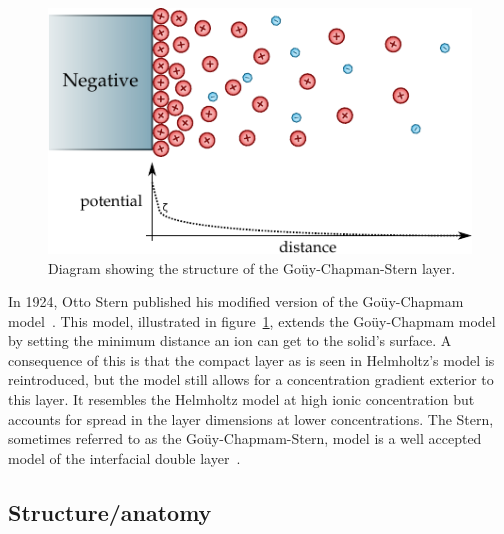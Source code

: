     \begin{figure}
      \begin{center}
        \includegraphics{content/introduction/graphics/model_stern}
      \end{center}
      \caption{Diagram showing the structure of the Goüy-Chapman-Stern layer.}
      \label{fig:doubleLayerModel_stern}
    \end{figure}
    In 1924, Otto Stern published his modified version of the Goüy-Chapmam model~\cite{Stern1924}.
    This model, illustrated in figure~\ref{fig:doubleLayerModel_stern}, extends the Goüy-Chapmam model by setting the minimum distance an ion can get to the solid's surface.
    A consequence of this is that the compact layer as is seen in Helmholtz's model is reintroduced, but the model still allows for a concentration gradient exterior to this layer.
    It resembles the Helmholtz model at high ionic concentration but accounts for spread in the layer dimensions at lower concentrations.
    The Stern, sometimes referred to as the Goüy-Chapmam-Stern, model is a well accepted model of the interfacial double layer~\cite{Olthuis2005}.



  \subsection{Structure/anatomy}
    \label{sub:backgound_doubleLayers_anatomy}


